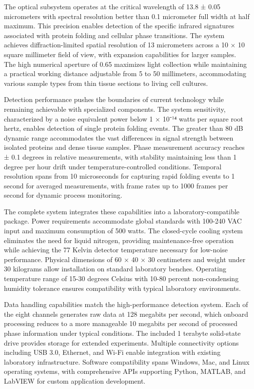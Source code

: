 \documentclass[12pt,a4paper]{report}
\begin{document}
The optical subsystem operates at the critical wavelength of 13.8 ± 0.05 micrometers with spectral resolution better than 0.1 micrometer full width at half maximum. This precision enables detection of the specific infrared signatures associated with protein folding and cellular phase transitions. The system achieves diffraction-limited spatial resolution of 13 micrometers across a 10 × 10 square millimeter field of view, with expansion capabilities for larger samples. The high numerical aperture of 0.65 maximizes light collection while maintaining a practical working distance adjustable from 5 to 50 millimeters, accommodating various sample types from thin tissue sections to living cell cultures.

Detection performance pushes the boundaries of current technology while remaining achievable with specialized components. The system sensitivity, characterized by a noise equivalent power below 1 × 10⁻¹⁴ watts per square root hertz, enables detection of single protein folding events. The greater than 80 dB dynamic range accommodates the vast differences in signal strength between isolated proteins and dense tissue samples. Phase measurement accuracy reaches ± 0.1 degrees in relative measurements, with stability maintaining less than 1 degree per hour drift under temperature-controlled conditions. Temporal resolution spans from 10 microseconds for capturing rapid folding events to 1 second for averaged measurements, with frame rates up to 1000 frames per second for dynamic process monitoring.

The complete system integrates these capabilities into a laboratory-compatible package. Power requirements accommodate global standards with 100-240 VAC input and maximum consumption of 500 watts. The closed-cycle cooling system eliminates the need for liquid nitrogen, providing maintenance-free operation while achieving the 77 Kelvin detector temperature necessary for low-noise performance. Physical dimensions of 60 × 40 × 30 centimeters and weight under 30 kilograms allow installation on standard laboratory benches. Operating temperature range of 15-30 degrees Celsius with 10-80 percent non-condensing humidity tolerance ensures compatibility with typical laboratory environments.

Data handling capabilities match the high-performance detection system. Each of the eight channels generates raw data at 128 megabits per second, which onboard processing reduces to a more manageable 10 megabits per second of processed phase information under typical conditions. The included 1 terabyte solid-state drive provides storage for extended experiments. Multiple connectivity options including USB 3.0, Ethernet, and Wi-Fi enable integration with existing laboratory infrastructure. Software compatibility spans Windows, Mac, and Linux operating systems, with comprehensive APIs supporting Python, MATLAB, and LabVIEW for custom application development.
\end{document}
